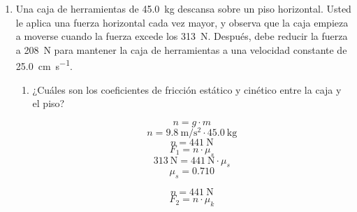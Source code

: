 \documentclass[Física - Práctica.root.tex]{subfiles}
\newcommand{\gravity}[1][per-mode=fraction]{\SI[#1]{9,8}{\meter\per\second\squared}}
\begin{document}
\begin{enumerate}
  \item Una caja de herramientas de \SI{45,0}{\kilogram} descansa sobre un piso horizontal. Usted le aplica
        una fuerza horizontal cada vez mayor, y observa que la caja empieza a moverse cuando la
        fuerza excede los \SI{313}{\newton}. Después, debe reducir la fuerza a \SI{208}{\newton} para mantener la caja de
        herramientas a una velocidad constante de \SI[per-mode=symbol]{25,0}{\centi\meter\per\second}.
        \begin{enumerate}
          \item ¿Cuáles son los coeficientes de fricción estático y cinético entre la caja y el piso?
                \begin{center}
                  \[ n = g\cdot m \]
                  \[ n = \gravity\cdot \SI{45,0}{\kilo\gram} \]
                  \[ n = \SI{441}{\newton} \]
                  \[ F_1 = n\cdot\mu_s \]
                  \[ \SI{313}{\newton} = \SI{441}{\newton}\cdot\mu_s \]
                  \[ \boxed{ \mu_s = \num{0,710} } \]
                  \[ n = \SI{441}{\newton} \]
                  \[ F_2 = n\cdot\mu_k \]

\end{center}
\end{enumerate}
\end{enumerate}
\end{document}
